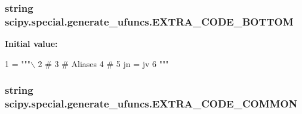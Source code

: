 \subsubsection[{E\+X\+T\+R\+A\+\_\+\+C\+O\+D\+E\+\_\+\+B\+O\+T\+T\+O\+M}]{\setlength{\rightskip}{0pt plus 5cm}string scipy.\+special.\+generate\+\_\+ufuncs.\+E\+X\+T\+R\+A\+\_\+\+C\+O\+D\+E\+\_\+\+B\+O\+T\+T\+O\+M}\label{namespacescipy_1_1special_1_1generate__ufuncs_ae166fec34c660258ed3c76495a2637b7}
{\bfseries Initial value\+:}
\begin{DoxyCode}
1 = \textcolor{stringliteral}{"""\(\backslash\)}
2 \textcolor{stringliteral}{#}
3 \textcolor{stringliteral}{# Aliases}
4 \textcolor{stringliteral}{#}
5 \textcolor{stringliteral}{jn = jv}
6 \textcolor{stringliteral}{"""}
\end{DoxyCode}
\hypertarget{namespacescipy_1_1special_1_1generate__ufuncs_a8a92e12ccc551a7163ad68e57106b179}{}
\subsubsection[{E\+X\+T\+R\+A\+\_\+\+C\+O\+D\+E\+\_\+\+C\+O\+M\+M\+O\+N}]{\setlength{\rightskip}{0pt plus 5cm}string scipy.\+special.\+generate\+\_\+ufuncs.\+E\+X\+T\+R\+A\+\_\+\+C\+O\+D\+E\+\_\+\+C\+O\+M\+M\+O\+N}\label{namespacescipy_1_1special_1_1generate__ufuncs_a8a92e12ccc551a7163ad68e57106b179}
\hypertarget{namespacescipy_1_1special_1_1generate__ufuncs_ae8498267d11764ae7751c668923040bf}{}
